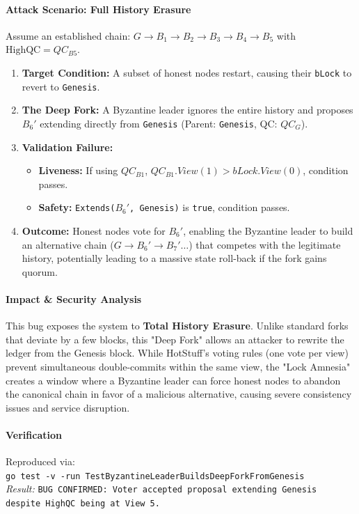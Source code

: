 \documentclass{article}
\theoremstyle{plain}
\theoremstyle{definition}
\theoremstyle{remark}
\begin{document}
{\paragraph{Attack Scenario: Full History Erasure}
Assume an established chain: $G \rightarrow B_1 \rightarrow B_2 \rightarrow B_3 \rightarrow B_4 \rightarrow B_5$ with $\text{HighQC} = QC_{B5}$.
\begin{enumerate}
    \item \textbf{Target Condition:} A subset of honest nodes restart, causing their \texttt{bLock} to revert to \texttt{Genesis}.
    \item \textbf{The Deep Fork:} A Byzantine leader ignores the entire history and proposes $B_6'$ extending directly from \texttt{Genesis} (Parent: \texttt{Genesis}, QC: $QC_{G}$).
    \item \textbf{Validation Failure:}
        \begin{itemize}
            \item \textbf{Liveness:} If using $QC_{B1}$, $QC_{B1}.View(1) > bLock.View(0)$, condition passes.
            \item \textbf{Safety:} \texttt{Extends($B_6'$, Genesis)} is \texttt{true}, condition passes.
        \end{itemize}
    \item \textbf{Outcome:} Honest nodes vote for $B_6'$, enabling the Byzantine leader to build an alternative chain ($G \rightarrow B_6' \rightarrow B_7' \dots$) that competes with the legitimate history, potentially leading to a massive state roll-back if the fork gains quorum.
\end{enumerate}

\paragraph{Impact \& Security Analysis}
This bug exposes the system to \textbf{Total History Erasure}. Unlike standard forks that deviate by a few blocks, this "Deep Fork" allows an attacker to rewrite the ledger from the Genesis block. While HotStuff's voting rules (one vote per view) prevent simultaneous double-commits within the same view, the "Lock Amnesia" creates a window where a Byzantine leader can force honest nodes to abandon the canonical chain in favor of a malicious alternative, causing severe consistency issues and service disruption.

\paragraph{Verification}
Reproduced via: \\
\texttt{go test -v -run TestByzantineLeaderBuildsDeepForkFromGenesis} \\
\textit{Result:}  \texttt{BUG CONFIRMED: Voter accepted proposal extending Genesis despite HighQC being at View 5.}
}
\end{document}
